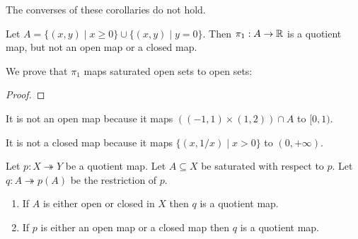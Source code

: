 \begin{example}
    The converses of these corollaries do not hold.

    Let $A = \{ (x,y) \mid x \geq 0 \} \cup \{ (x,y) \mid y = 0 \}$. Then $\pi_1 : A \rightarrow \mathbb{R}$ is a quotient map, but not an open map or a closed map.

    We prove that $\pi_1$ maps saturated open sets to open sets:
    \begin{proof}
    \end{proof}

    It is not an open map because it maps $((-1,1) \times (1,2)) \cap A$ to $[0,1)$.

    It is not a closed map because it maps $\{ (x, 1/x) \mid x > 0 \}$ to $(0, +\infty)$.
\end{example}

\begin{proposition}
    \label{proposition:quotient_restriction}
    Let $p : X \twoheadrightarrow Y$ be a quotient map. Let $A \subseteq X$ be saturated with respect to $p$. Let $q : A \twoheadrightarrow p(A)$ be the restriction of $p$.
    \begin{enumerate}
        \item If $A$ is either open or closed in $X$ then $q$ is a quotient map.
        \item If $p$ is either an open map or a closed map then $q$ is a quotient map.
    \end{enumerate}
\end{proposition}

